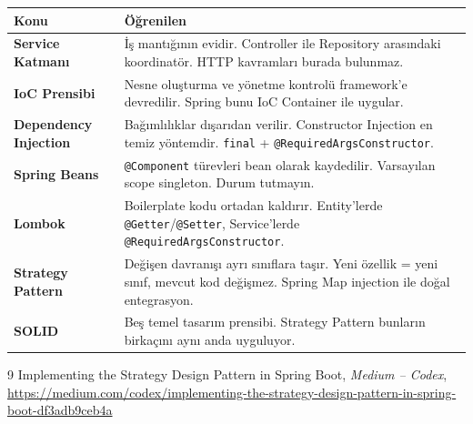 \documentclass[11pt,a4paper]{article}
\begin{document}
\begin{center}
\renewcommand{\arraystretch}{1.4}
\begin{tabular}{p{4cm}p{9cm}}
\toprule
\textbf{Konu} & \textbf{\"{O}\u{g}renilen} \\
\midrule
\textbf{Service Katman{\i}} & \.{I}\c{s} mant{\i}\u{g}{\i}n{\i}n evidir. Controller ile Repository aras{\i}ndaki koordinat\"{o}r. HTTP kavramlar{\i} burada bulunmaz. \\
\textbf{IoC Prensibi} & Nesne olu\c{s}turma ve y\"{o}netme kontrol\"{u} framework'e devredilir. Spring bunu IoC Container ile uygular. \\
\textbf{Dependency Injection} & Ba\u{g}{\i}ml{\i}l{\i}klar d{\i}\c{s}ar{\i}dan verilir. Constructor Injection en temiz y\"{o}ntemdir. \texttt{final} + \texttt{@RequiredArgsConstructor}. \\
\textbf{Spring Beans} & \texttt{@Component} t\"{u}revleri bean olarak kaydedilir. Varsay{\i}lan scope singleton. Durum tutmay{\i}n. \\
\textbf{Lombok} & Boilerplate kodu ortadan kald{\i}r{\i}r. Entity'lerde \texttt{@Getter}/\texttt{@Setter}, Service'lerde \texttt{@RequiredArgsConstructor}. \\
\textbf{Strategy Pattern} & De\u{g}i\c{s}en davran{\i}\c{s}{\i} ayr{\i} s{\i}n{\i}flara ta\c{s}{\i}r. Yeni \"{o}zellik = yeni s{\i}n{\i}f, mevcut kod de\u{g}i\c{s}mez. Spring Map injection ile do\u{g}al entegrasyon. \\
\textbf{SOLID} & Be\c{s} temel tasar{\i}m prensibi. Strategy Pattern bunlar{\i}n birka\c{c}{\i}n{\i} ayn{\i} anda uyguluyor. \\
\bottomrule
\end{tabular}
\end{center}

\begin{thebibliography}{9}
Implementing the Strategy Design Pattern in Spring Boot,
\textit{Medium -- Codex},
\url{https://medium.com/codex/implementing-the-strategy-design-pattern-in-spring-boot-df3adb9ceb4a}
\end{thebibliography}
\end{document}
